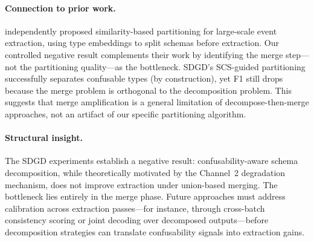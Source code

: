 \paragraph{Connection to prior work.}
\citet{llm-pee-2025} independently proposed similarity-based partitioning for large-scale event extraction, using type embeddings to split schemas before extraction.  Our controlled negative result complements their work by identifying the merge step---not the partitioning quality---as the bottleneck.  SDGD's SCS-guided partitioning successfully separates confusable types (by construction), yet F1 still drops because the merge problem is orthogonal to the decomposition problem.  This suggests that merge amplification is a general limitation of decompose-then-merge approaches, not an artifact of our specific partitioning algorithm.

\paragraph{Structural insight.}
The SDGD experiments establish a negative result: confusability-aware schema decomposition, while theoretically motivated by the Channel~2 degradation mechanism, does not improve extraction under union-based merging.  The bottleneck lies entirely in the merge phase.  Future approaches must address calibration across extraction passes---for instance, through cross-batch consistency scoring or joint decoding over decomposed outputs---before decomposition strategies can translate confusability signals into extraction gains.
